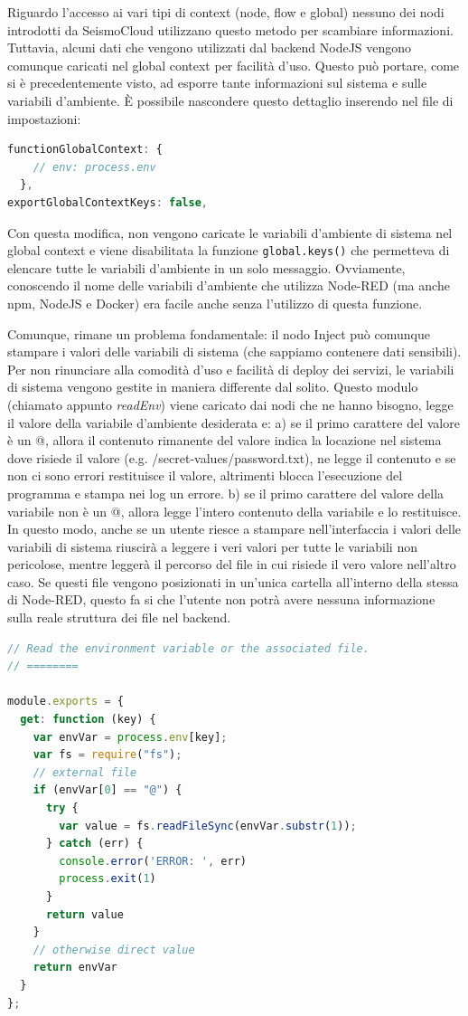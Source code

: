 \documentclass[a4paper,10pt]{memoir}
\begin{document}
Riguardo l'accesso ai vari tipi di context (node, flow e global) nessuno dei nodi introdotti da SeismoCloud utilizzano questo metodo per scambiare informazioni.
Tuttavia, alcuni dati che vengono utilizzati dal backend NodeJS vengono comunque caricati nel global context per facilità d'uso. Questo può portare, come si è precedentemente visto, ad esporre tante informazioni sul sistema e sulle variabili d'ambiente.
È possibile nascondere questo dettaglio inserendo nel file di impostazioni:
\begin{lstlisting}[language=Javascript, firstnumber=56]
functionGlobalContext: {
    // env: process.env
  },
exportGlobalContextKeys: false,
\end{lstlisting}
Con questa modifica, non vengono caricate le variabili d'ambiente di sistema nel global context e viene disabilitata la funzione \texttt{global.keys()} che permetteva di elencare tutte le variabili d'ambiente in un solo messaggio.
Ovviamente, conoscendo il nome delle variabili d'ambiente che utilizza Node-RED (ma anche npm, NodeJS e Docker) era facile anche senza l'utilizzo di questa funzione.

Comunque, rimane un problema fondamentale: il nodo Inject può comunque stampare i valori delle variabili di sistema (che sappiamo contenere dati sensibili).
Per non rinunciare alla comodità d'uso e facilità di deploy dei servizi, le variabili di sistema vengono gestite in maniera differente dal solito.
Questo modulo (chiamato appunto \textit{readEnv}) viene caricato dai nodi che ne hanno bisogno, legge il valore della variabile d'ambiente desiderata e: a) se il primo carattere del valore è un @, allora il contenuto rimanente del valore indica la locazione nel sistema dove risiede il valore (e.g. /secret-values/password.txt), ne legge il contenuto e se non ci sono errori restituisce il valore, altrimenti blocca l'esecuzione del programma e stampa nei log un errore. b) se il primo carattere del valore della variabile non è un @, allora legge l'intero contenuto della variabile e lo restituisce.
In questo modo, anche se un utente riesce a stampare nell'interfaccia i valori delle variabili di sistema riuscirà a leggere i veri valori per tutte le variabili non pericolose, mentre leggerà il percorso del file in cui risiede il vero valore nell'altro caso.
Se questi file vengono posizionati in un'unica cartella all'interno della stessa di Node-RED, questo fa si che l'utente non potrà avere nessuna informazione sulla reale struttura dei file nel backend.
\begin{lstlisting}[language=Javascript]
// Read the environment variable or the associated file.
// ========

module.exports = {
  get: function (key) {
    var envVar = process.env[key];
    var fs = require("fs");
    // external file
    if (envVar[0] == "@") {
      try {
        var value = fs.readFileSync(envVar.substr(1));
      } catch (err) {
        console.error('ERROR: ', err)
        process.exit(1)
      }
      return value
    }
    // otherwise direct value
    return envVar
  }
};

\end{lstlisting}
\end{document}
